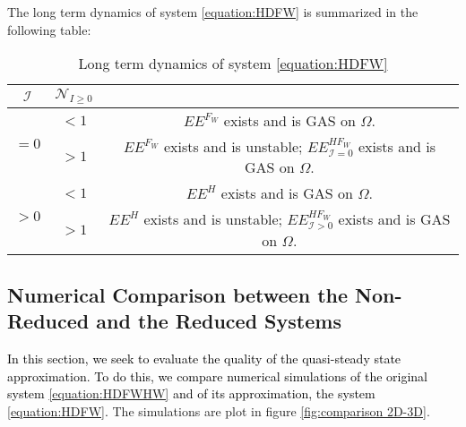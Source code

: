 \documentclass{article}
\newcommand{\cI}{\mathcal{I}}
\newcommand{\vdeux}[1]{\textcolor{black}{#1}}
\theoremstyle{definition}
\theoremstyle{remark}
\begin{document}
The long term dynamics of system \eqref{equation:HDFW} is summarized in the following table:

\begin{table}[!ht]
\centering
\def\arraystretch{2}
\begin{tabular}{c|c|c}
$\cI$  & $\mathcal{N}_{I\geq 0}$ & \\
\hline
\multirow{2}{*}{$=0$}& $ < 1$ &$EE^{F_W}$ exists and is GAS on $\Omega$.  \\
\cline{2-3}
 &  \multirow{1}{*}{$> 1$}  &$EE^{F_W}$ exists and is unstable; $EE^{HF_W}_{\cI=0}$ exists and is GAS on $\Omega$.\\
\hline
\hline
\multirow{2}{*}{$>0$} & $< 1$ &$EE^{H}$ exists and is GAS on $\Omega$. \\
\cline{2-3}
 & \multirow{1}{*}{$> 1$}  &$EE^{H}$ exists and is unstable; $EE^{HF_W}_{\cI>0}$ exists and is GAS on $\Omega$. \\
\end{tabular}
\caption{\centering Long term dynamics of system \eqref{equation:HDFW}}
\label{table: reduced long term dynamics, I = 0}
\end{table}

\subsection{Numerical Comparison between the Non-Reduced and the Reduced Systems}
\vdeux{In this section, we seek to evaluate the quality of the quasi-steady state approximation. To do this, we compare numerical simulations of the original system \eqref{equation:HDFWHW} and of its approximation, the system \eqref{equation:HDFW}.} The simulations are plot in figure \ref{fig:comparison 2D-3D}.
\end{document}
